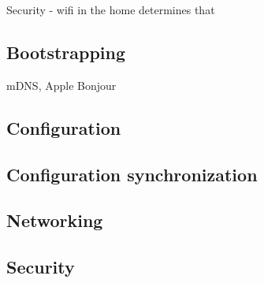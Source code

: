 \documentclass{article}
\begin{document}
Security - wifi in the home determines that
\subsection{Bootstrapping}

mDNS, Apple Bonjour
\subsection{Configuration}

\subsection{Configuration synchronization}

\subsection{Networking}

\subsection{Security}



\end{document}
